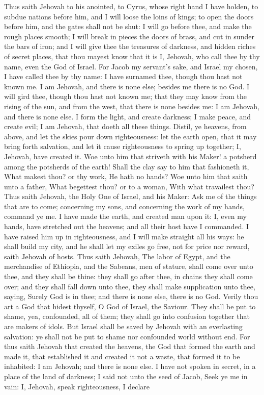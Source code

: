 Thus saith Jehovah to his anointed, to Cyrus, whose right hand I have holden, to subdue nations before him, and I will loose the loins of kings; to open the doors before him, and the gates shall not be shut: I will go before thee, and make the rough places smooth; I will break in pieces the doors of brass, and cut in sunder the bars of iron; and I will give thee the treasures of darkness, and hidden riches of secret places, that thou mayest know that it is I, Jehovah, who call thee by thy name, even the God of Israel. For Jacob my servant’s sake, and Israel my chosen, I have called thee by thy name: I have surnamed thee, though thou hast not known me. I am Jehovah, and there is none else; besides me there is no God. I will gird thee, though thou hast not known me; that they may know from the rising of the sun, and from the west, that there is none besides me: I am Jehovah, and there is none else. I form the light, and create darkness; I make peace, and create evil; I am Jehovah, that doeth all these things.  Distil, ye heavens, from above, and let the skies pour down righteousness: let the earth open, that it may bring forth salvation, and let it cause righteousness to spring up together; I, Jehovah, have created it.  Woe unto him that striveth with his Maker! a potsherd among the potsherds of the earth! Shall the clay say to him that fashioneth it, What makest thou? or thy work, He hath no hands? Woe unto him that saith unto a father, What begettest thou? or to a woman, With what travailest thou?  Thus saith Jehovah, the Holy One of Israel, and his Maker: Ask me of the things that are to come; concerning my sons, and concerning the work of my hands, command ye me. I have made the earth, and created man upon it: I, even my hands, have stretched out the heavens; and all their host have I commanded. I have raised him up in righteousness, and I will make straight all his ways: he shall build my city, and he shall let my exiles go free, not for price nor reward, saith Jehovah of hosts.  Thus saith Jehovah, The labor of Egypt, and the merchandise of Ethiopia, and the Sabeans, men of stature, shall come over unto thee, and they shall be thine: they shall go after thee, in chains they shall come over; and they shall fall down unto thee, they shall make supplication unto thee, saying, Surely God is in thee; and there is none else, there is no God. Verily thou art a God that hidest thyself, O God of Israel, the Saviour. They shall be put to shame, yea, confounded, all of them; they shall go into confusion together that are makers of idols. But Israel shall be saved by Jehovah with an everlasting salvation: ye shall not be put to shame nor confounded world without end.  For thus saith Jehovah that created the heavens, the God that formed the earth and made it, that established it and created it not a waste, that formed it to be inhabited: I am Jehovah; and there is none else. I have not spoken in secret, in a place of the land of darkness; I said not unto the seed of Jacob, Seek ye me in vain: I, Jehovah, speak righteousness, I declare 